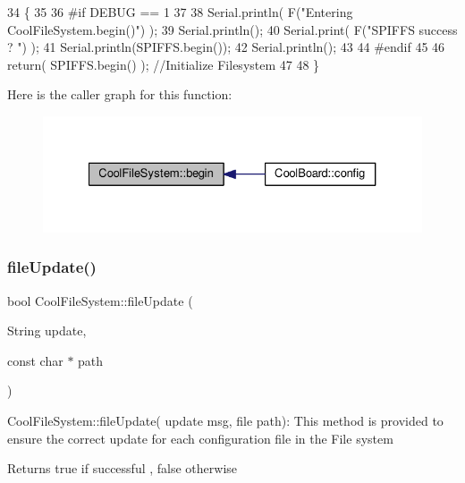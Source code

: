 \begin{DoxyCode}
34 \{
35 
36 \textcolor{preprocessor}{#if DEBUG == 1}
37 
38     Serial.println( F(\textcolor{stringliteral}{"Entering CoolFileSystem.begin()"}) );
39     Serial.println();   
40     Serial.print( F(\textcolor{stringliteral}{"SPIFFS success ? "}) );
41     Serial.println(SPIFFS.begin());
42     Serial.println();
43 
44 \textcolor{preprocessor}{#endif}
45 
46     \textcolor{keywordflow}{return}( SPIFFS.begin() );                                   \textcolor{comment}{//Initialize Filesystem}
47 
48 \}
\end{DoxyCode}
Here is the caller graph for this function\+:\nopagebreak
\begin{figure}[H]
\begin{center}
\leavevmode
\includegraphics[width=327pt]{classCoolFileSystem_a6ba6f666ed4c530174f8569d2c636748_icgraph}
\end{center}
\end{figure}
\mbox{\label{classCoolFileSystem_a13f2958f5b87757c31fc53797a30d23a}} 
\subsubsection{\texorpdfstring{file\+Update()}{fileUpdate()}}
{\footnotesize\ttfamily bool Cool\+File\+System\+::file\+Update (\begin{DoxyParamCaption}\item[{String}]{update,  }\item[{const char $\ast$}]{path }\end{DoxyParamCaption})}

Cool\+File\+System\+::file\+Update( update msg, file path)\+: This method is provided to ensure the correct update for each configuration file in the File system

\begin{DoxyReturn}{Returns}
true if successful , false otherwise 
\end{DoxyReturn}


